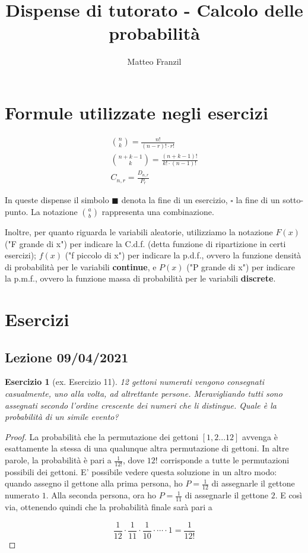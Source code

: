 \documentclass[12pt]{article}
\newtheorem{theorem}{Esercizio}
\begin{document}
\title{Dispense di tutorato - Calcolo delle probabilità}
\author{Matteo Franzil}
\maketitle

\tableofcontents

\newpage
\section{Formule utilizzate negli esercizi}

\begin{gather*}
	\binom{n}{k} = \frac{n!}{(n-r)! \cdot r!} \\
	\binom{n + k - 1}{k} = \frac{(n + k - 1)!}{k! \cdot (n - 1)!} \\
	C_{n, r} = \frac{D_{n, r}}{P_r}
\end{gather*}

In queste dispense il simbolo $\blacksquare$ denota la fine di un esercizio, $\square$ la fine di un sotto-punto. La notazione $\binom{a}{b}$ rappresenta una combinazione.

Inoltre, per quanto riguarda le variabili aleatorie, utilizziamo la notazione $F(x)$ ("F grande di x") per indicare la C.d.f. (detta funzione di ripartizione in certi esercizi); $f(x)$ ("f piccolo di x") per indicare la p.d.f., ovvero la funzione densità di probabilità per le variabili \textbf{continue}, e $P(x)$ ("P grande di x") per indicare la p.m.f., ovvero la funzione massa di probabilità per le variabili \textbf{discrete}.


\section{Esercizi}
\subsection{Lezione 09/04/2021}

\begin{theorem}[ex. Esercizio 11]
	12 gettoni numerati vengono consegnati casualmente, uno alla volta, ad altrettante persone. Meravigliando tutti sono assegnati secondo l'ordine crescente dei numeri che li distingue. Quale è la probabilità di un simile evento?
\end{theorem}

\begin{proof}
	La probabilità che la permutazione dei gettoni $[1, 2...12]$ avvenga è esattamente la stessa di una qualunque altra permutazione di gettoni. In altre parole, la probabilità è pari a $\frac{1}{12!}$, dove $12!$ corrisponde a tutte le permutazioni possibili dei gettoni. E' possibile vedere questa soluzione in un altro modo: quando assegno il gettone alla prima persona, ho $P = \frac{1}{12}$ di assegnarle il gettone numerato $1$. Alla seconda persona, ora ho $P =\frac{1}{11}$ di assegnarle il gettone $2$. E così via, ottenendo quindi che la probabilità finale sarà pari a
	
	\[
        \frac{1}{12} \cdot \frac{1}{11} \cdot \frac{1}{10} \cdot \cdots \cdot 1 = \frac{1}{12!}
    \]
\end{proof}
\end{document}

